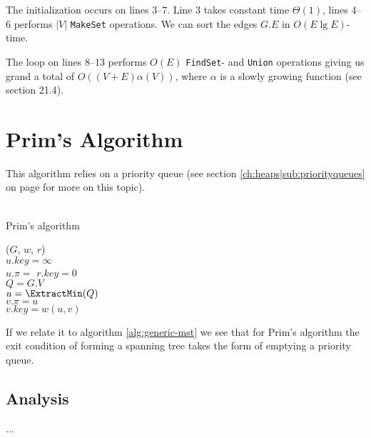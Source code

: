 The initialization occurs on lines 3--7. Line 3 takes constant time
$\Theta(1)$, lines 4--6 performs $|V|$ \texttt{MakeSet} operations. We can
sort the edges $G.E$ in $O(E \lg E)$-time.

The loop on lines 8--13 performs $O(E)$ \texttt{FindSet}- and \texttt{Union}
operations giving us grand a total of $O((V+E) \alpha(V))$, where $\alpha$
is a slowly growing function (see section 21.4\cite[p. 573]{clrs}).

\newpage
\section{Prim's Algorithm}
This algorithm relies on a priority queue (see section
\ref{ch:heaps|sub:priorityqueues} on page \pageref{ch:heaps|sub:priorityqueues}
for more on this topic).
\\\\
\begin{algorithm}[H]
	\caption{Prim's algorithm}
	\label{alg:prim-mst}
	
	
	
	
	
	\BlankLine
	\PrimMST($G$, $w$, $r$) \\
	\Begin
	{
		{
			$u.key = \infty$ \\
			$u.\pi = $ \Nil
		}
		$r.key = 0$ \\
		$Q = G.V$ \\
		
		{
			$u = \ExtractMin(Q)$ \\
			{
				{
					$v.\pi = u$ \\
					$v.key = w(u, v)$
				}
			}
		}
	}
\end{algorithm}
If we relate it to algorithm \ref{alg:generic-mst} we see that for Prim's
algorithm the exit condition of forming a spanning tree takes the form of
emptying a priority queue.

\newpage
\subsection{Analysis}
...
